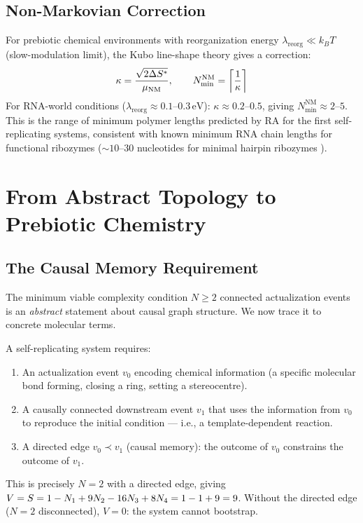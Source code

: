 \documentclass[12pt,a4paper]{article}
\begin{document}
\subsection{Non-Markovian Correction}

For prebiotic chemical environments with reorganization energy $\lambda_{\mathrm{reorg}} \ll k_BT$ (slow-modulation limit), the Kubo line-shape theory gives a correction:
\begin{equation}
  \kappa = \frac{\sqrt{2\Delta S^*}}{\mu_{\mathrm{NM}}}, \qquad N_{\min}^{\mathrm{NM}} = \left\lceil \frac{1}{\kappa}\right\rceil
  \label{eq:nonmarkov}
\end{equation}
For RNA-world conditions ($\lambda_{\mathrm{reorg}} \approx 0.1$--$0.3\,\mathrm{eV}$): $\kappa \approx 0.2$--$0.5$, giving $N_{\min}^{\mathrm{NM}} \approx 2$--$5$.  This is the range of minimum polymer lengths predicted by RA for the first self-replicating systems, consistent with known minimum RNA chain lengths for functional ribozymes ($\sim 10$--$30$ nucleotides for minimal hairpin ribozymes \cite{Joyce2018}).

\section{From Abstract Topology to Prebiotic Chemistry}\label{sec:rna}

\subsection{The Causal Memory Requirement}

The minimum viable complexity condition $N \geq 2$ connected actualization events is an \emph{abstract} statement about causal graph structure.  We now trace it to concrete molecular terms.

A self-replicating system requires:
\begin{enumerate}
  \item An actualization event $v_0$ encoding chemical information (a specific molecular bond forming, closing a ring, setting a stereocentre).
  \item A causally connected downstream event $v_1$ that uses the information from $v_0$ to reproduce the initial condition — i.e., a template-dependent reaction.
  \item A directed edge $v_0 \prec v_1$ (causal memory): the outcome of $v_0$ constrains the outcome of $v_1$.
\end{enumerate}
This is precisely $N=2$ with a directed edge, giving $V = S = 1 - N_1 + 9N_2 - 16N_3 + 8N_4 = 1 - 1 + 9 = 9$.  Without the directed edge ($N=2$ disconnected), $V=0$: the system cannot bootstrap.
\end{document}
